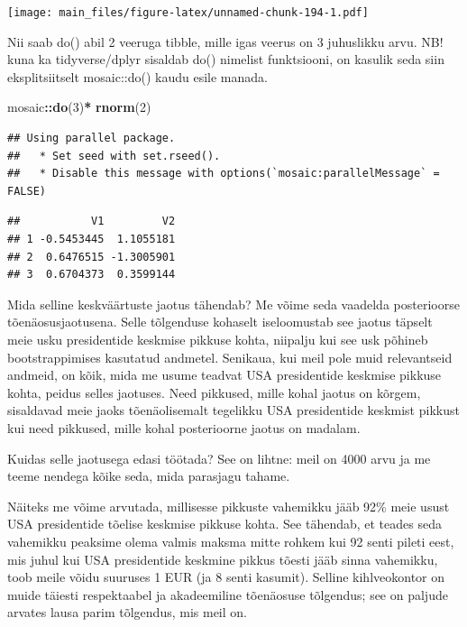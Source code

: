 \documentclass[]{book}
\newenvironment{Shaded}{\begin{snugshade}}{\end{snugshade}}
\newcommand{\KeywordTok}[1]{\textcolor[rgb]{0.13,0.29,0.53}{\textbf{#1}}}
\newcommand{\DecValTok}[1]{\textcolor[rgb]{0.00,0.00,0.81}{#1}}
\newcommand{\StringTok}[1]{\textcolor[rgb]{0.31,0.60,0.02}{#1}}
\newcommand{\OperatorTok}[1]{\textcolor[rgb]{0.81,0.36,0.00}{\textbf{#1}}}
\newcommand{\NormalTok}[1]{#1}
\begin{document}
\texttt{[image: main\_files/figure-latex/unnamed-chunk-194-1.pdf]}

Nii saab do() abil 2 veeruga tibble, mille igas veerus on 3 juhuslikku
arvu. NB! kuna ka tidyverse/dplyr sisaldab do() nimelist funktsiooni, on
kasulik seda siin eksplitsiitselt mosaic::do() kaudu esile manada.

\begin{Shaded}
\begin{Highlighting}[]
\NormalTok{mosaic}\OperatorTok{::}\KeywordTok{do}\NormalTok{(}\DecValTok{3}\NormalTok{)}\OperatorTok{*}\StringTok{ }\KeywordTok{rnorm}\NormalTok{(}\DecValTok{2}\NormalTok{)}
\end{Highlighting}
\end{Shaded}

\begin{verbatim}
## Using parallel package.
##   * Set seed with set.rseed().
##   * Disable this message with options(`mosaic:parallelMessage` = FALSE)
\end{verbatim}

\begin{verbatim}
##           V1         V2
## 1 -0.5453445  1.1055181
## 2  0.6476515 -1.3005901
## 3  0.6704373  0.3599144
\end{verbatim}

Mida selline keskväärtuste jaotus tähendab? Me võime seda vaadelda
posterioorse tõenäosusjaotusena. Selle tõlgenduse kohaselt iseloomustab
see jaotus täpselt meie usku presidentide keskmise pikkuse kohta,
niipalju kui see usk põhineb bootstrappimises kasutatud andmetel.
Senikaua, kui meil pole muid relevantseid andmeid, on kõik, mida me
usume teadvat USA presidentide keskmise pikkuse kohta, peidus selles
jaotuses. Need pikkused, mille kohal jaotus on kõrgem, sisaldavad meie
jaoks tõenäolisemalt tegelikku USA presidentide keskmist pikkust kui
need pikkused, mille kohal posterioorne jaotus on madalam.

Kuidas selle jaotusega edasi töötada? See on lihtne: meil on 4000 arvu
ja me teeme nendega kõike seda, mida parasjagu tahame.

Näiteks me võime arvutada, millisesse pikkuste vahemikku jääb 92\% meie
usust USA presidentide tõelise keskmise pikkuse kohta. See tähendab, et
teades seda vahemikku peaksime olema valmis maksma mitte rohkem kui 92
senti pileti eest, mis juhul kui USA presidentide keskmine pikkus tõesti
jääb sinna vahemikku, toob meile võidu suuruses 1 EUR (ja 8 senti
kasumit). Selline kihlveokontor on muide täiesti respektaabel ja
akadeemiline tõenäosuse tõlgendus; see on paljude arvates lausa parim
tõlgendus, mis meil on.
\end{document}
